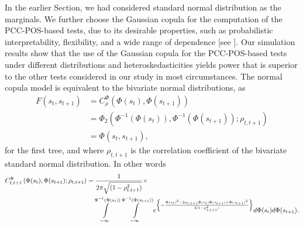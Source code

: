 \documentclass[harvard,11pt]{article}
\begin{document}
 In the earlier Section, we had considered standard normal distribution as the marginals. We further choose the Gaussian copula for the computation of the PCC-POS-based tests, due to its desirable properties, such as probabilistic interpretability, flexibility, and a wide range of dependence [see \citet{durante2010copula}]. Our simulation results show that the use of the Gaussian copula for the PCC-POS-based tests under different distributions and heteroskedasticities yields power that is superior to the other tests considered in our study in most circumstances. The normal copula model is equivalent to the bivariate normal distributions, as
\begingroup
\allowdisplaybreaks
\begin{align*}
F(s_t,s_{t+1})&=C_{\rho}^{\Phi}(\Phi(s_t),\Phi(s_{t+1}))\\
&=\Phi_2\left(\Phi^{-1}\left(\Phi(s_t)\right),\Phi^{-1}\left(\Phi(s_{t+1})\right);\rho_{t,t+1}\right)\\
&=\Phi(s_t,s_{t+1}),
\end{align*}
\endgroup
for the first tree, and where $\rho_{t,t+1}$ is the correlation coefficient of the bivariate standard normal distribution. In other words
\begingroup
\allowdisplaybreaks
\begin{align*}
C_{t,t+1}^{\Phi}\left(\Phi(s_t),\Phi(s_{t+1});{\rho_{t,t+1}}\right)&=\frac{1}{2\pi\sqrt{(1-\rho^2_{t,t+1})}}\times\\
&\textcolor{white}{=}\int\limits_{-\infty}^{\Phi^{-1}\left(\Phi(s_t)\right)}\int\limits_{-\infty}^{\Phi^{-1}\left(\Phi(s_{t+1})\right)}e^{\left\{-\frac{\Phi(s_t)^2-2\rho_{t,t+1} \Phi(s_t)\Phi(s_{t+1})+\Phi(s_{t+1})^2}{2(1-\rho_{t,t+1}^2)}\right\}}d\Phi(s_t)d\Phi(s_{t+1}).
\end{align*}
\endgroup
{}
\end{document}
